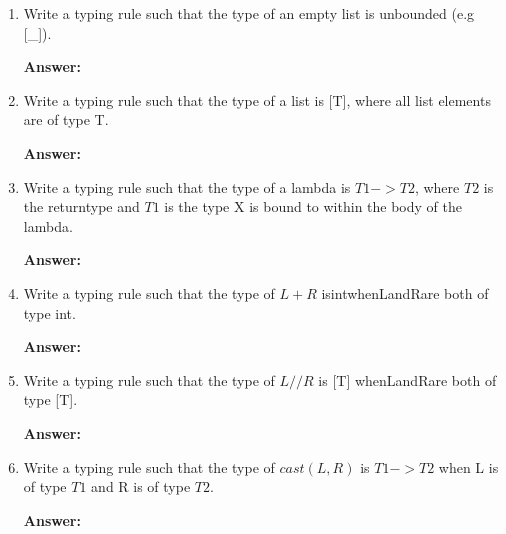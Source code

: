 \documentclass[a4paper]{article}
\theoremstyle{definition}
\begin{document}
\begin{enumerate}
  \item Write a typing rule such that the type of an empty list is unbounded (e.g [\_]).
  
  \textbf{Answer:}
  
  \item  Write a typing rule such that the type of a list is [T], where all list elements are of type T.
  
  \textbf{Answer:}
  
  \item Write a typing rule such that the type of a lambda is $T1->T2$, where $T2$ is the returntype and $T1$ is the type X is bound to within the body of the lambda.

  \textbf{Answer:}
  
  \item Write a typing rule such that the type of $L + R$ isintwhenLandRare both of type int.
  
  \textbf{Answer:}

  \item Write a typing rule such that the type of $L // R$ is [T] whenLandRare both of type [T].
  
  \textbf{Answer:}
  \item Write a typing rule such that the type of $cast(L,R)$ is $T1 -> T2$ when L is of type $T1$ and R is of type $T2$.
  
  \textbf{Answer:}

\end{enumerate}
\end{document}
